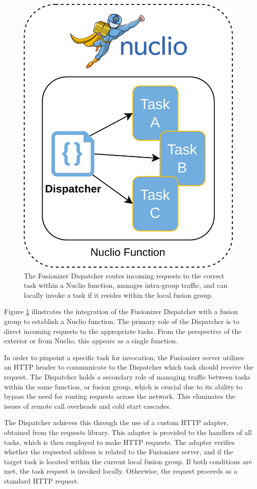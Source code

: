 \begin{figure}
    \centering
    \includegraphics[width=.5\linewidth]{../figures/fusionizer_dispatcher}
    \caption{
        The Fusionizer Dispatcher routes incoming requests to the correct task
        within a Nuclio function, manages intra-group traffic, and can locally
        invoke a task if it resides within the local fusion group.
    }
    \label{fig:fusionizer_dispatcher}
\end{figure}

Figure \ref{fig:fusionizer_dispatcher} illustrates the integration of the
Fusionizer Dispatcher with a fusion group to establish a Nuclio function. The
primary role of the Dispatcher is to direct incoming requests to the appropriate
tasks. From the perspective of the exterior or from Nuclio, this appears as a
single function.

In order to pinpoint a specific task for invocation, the Fusionizer server
utilizes an HTTP header to communicate to the Dispatcher which task should
receive the request. The Dispatcher holds a secondary role of managing traffic
between tasks within the same function, or fusion group, which is crucial due to
its ability to bypass the need for routing requests across the network. This
eliminates the issues of remote call overheads and cold start cascades.

The Dispatcher achieves this through the use of a custom HTTP adapter, obtained
from the requests library. This adapter is provided to the handlers of all
tasks, which is then employed to make HTTP requests. The adapter verifies
whether the requested address is related to the Fusionizer server, and if the
target task is located within the current local fusion group. If both conditions
are met, the task request is invoked locally. Otherwise, the request proceeds as
a standard HTTP request.

